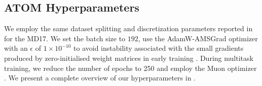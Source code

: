 \newpage
\subsection{ATOM Hyperparameters}
\label{appx:my_hyperparams}
We employ the same dataset splitting and discretization parameters reported in \textcite{xu_equivariant_2024} for the MD17. We set the batch size to \(192\), use the AdamW-AMSGrad optimizer \cite{loshchilov_decoupled_2017} with an \(\epsilon\) of \(1\times10^{-10}\) to avoid instability associated with the small gradients produced by zero-initialised weight matrices in early training \cite{jordan_nanogpt_2025}. During multitask training, we reduce the number of epochs to 250 and employ the Muon optimizer \cite{jordan_muon_2024, kim_pytorch_optimizer_2021}. We present a complete overview of our hyperparameters in .

